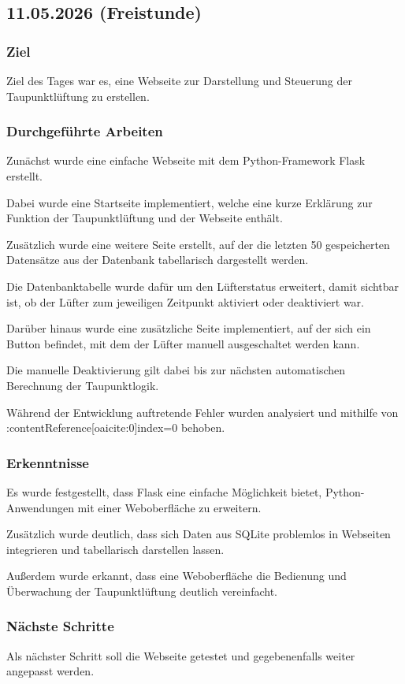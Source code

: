 \subsection{11.05.2026 (Freistunde)}

\subsubsection{Ziel}

Ziel des Tages war es, eine Webseite zur
Darstellung und Steuerung der Taupunktlüftung
zu erstellen.

\subsubsection{Durchgeführte Arbeiten}

Zunächst wurde eine einfache Webseite mit dem
Python-Framework Flask erstellt.

Dabei wurde eine Startseite implementiert,
welche eine kurze Erklärung zur Funktion der
Taupunktlüftung und der Webseite enthält.

Zusätzlich wurde eine weitere Seite erstellt,
auf der die letzten 50 gespeicherten Datensätze
aus der Datenbank tabellarisch dargestellt werden.

Die Datenbanktabelle wurde dafür um den
Lüfterstatus erweitert, damit sichtbar ist,
ob der Lüfter zum jeweiligen Zeitpunkt aktiviert
oder deaktiviert war.

Darüber hinaus wurde eine zusätzliche Seite
implementiert, auf der sich ein Button befindet,
mit dem der Lüfter manuell ausgeschaltet werden
kann.

Die manuelle Deaktivierung gilt dabei bis zur
nächsten automatischen Berechnung der
Taupunktlogik.

Während der Entwicklung auftretende Fehler
wurden analysiert und mithilfe von
:contentReference[oaicite:0]{index=0}
behoben.

\subsubsection{Erkenntnisse}

Es wurde festgestellt, dass Flask eine einfache
Möglichkeit bietet, Python-Anwendungen mit einer
Weboberfläche zu erweitern.

Zusätzlich wurde deutlich, dass sich Daten aus
SQLite problemlos in Webseiten integrieren und
tabellarisch darstellen lassen.

Außerdem wurde erkannt, dass eine Weboberfläche
die Bedienung und Überwachung der
Taupunktlüftung deutlich vereinfacht.

\subsubsection{Nächste Schritte}

Als nächster Schritt soll die Webseite getestet
und gegebenenfalls weiter angepasst werden.